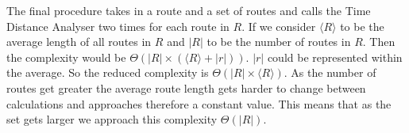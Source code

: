 The final procedure takes in a route and a set of routes and calls the Time Distance Analyser two times for each route in $R$.
If we consider $\langle R \rangle$ to be the average length of all routes in $R$ and $|R|$ to be the number of routes in $R$.
Then the complexity would be $\Theta(|R|\times(\langle R\rangle + |r|))$.
$|r|$ could be represented within the average.
So the reduced complexity is $\Theta(|R|\times\langle R\rangle)$.
As the number of routes get greater the average route length gets harder to change between calculations and approaches therefore a constant value.
This means that as the set gets larger we approach this complexity $\Theta(|R|)$.

